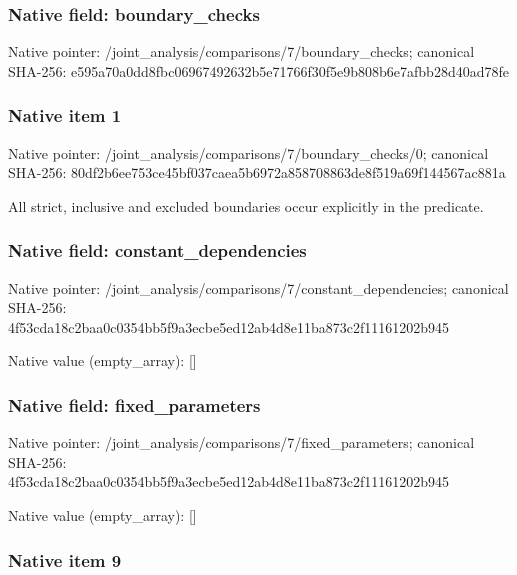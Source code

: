 \documentclass[10pt,a4paper]{article}
\begin{document}
\subsubsection{Native field: boundary\_checks}


Native pointer: /joint\_analysis/comparis\allowbreak{}ons/7/boundary\_checks; canonical SHA-256: e595a70a0dd8fbc069674926\allowbreak{}32b5e71766f30f5e9b808b6e\allowbreak{}7afbb28d40ad78fe



\subsubsection{Native item 1}


Native pointer: /joint\_analysis/comparis\allowbreak{}ons/7/boundary\_checks/0; canonical SHA-256: 80df2b6ee753ce45bf037cae\allowbreak{}a5b6972a858708863de8f519\allowbreak{}a69f144567ac881a


All strict, inclusive and excluded boundaries occur explicitly in the predicate.


\subsubsection{Native field: constant\_dependencies}


Native pointer: /joint\_analysis/comparis\allowbreak{}ons/7/constant\_dependenc\allowbreak{}ies; canonical SHA-256: 4f53cda18c2baa0c0354bb5f\allowbreak{}9a3ecbe5ed12ab4d8e11ba87\allowbreak{}3c2f11161202b945



Native value (empty\_array): []



\subsubsection{Native field: fixed\_parameters}


Native pointer: /joint\_analysis/comparis\allowbreak{}ons/7/fixed\_parameters; canonical SHA-256: 4f53cda18c2baa0c0354bb5f\allowbreak{}9a3ecbe5ed12ab4d8e11ba87\allowbreak{}3c2f11161202b945



Native value (empty\_array): []



\subsubsection{Native item 9}
\end{document}
